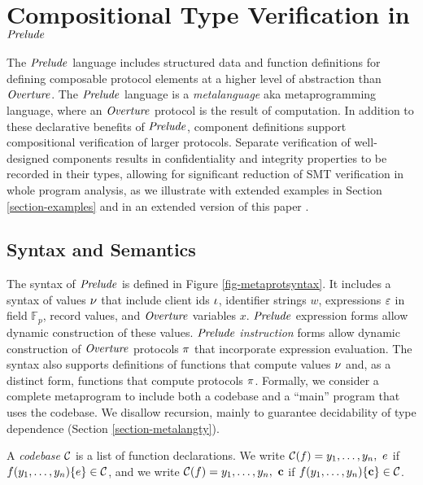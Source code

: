 \section{Compositional Type Verification in $\mathit{Prelude}$}
\label{section-metalang}

The $\mathit{Prelude}$ language \cite{skalka-near-ppdp24} includes structured
data and function definitions for defining composable protocol
elements at a higher level of abstraction than $\mathit{Overture}$.  The
$\mathit{Prelude}$ language is a \emph{metalanguage} aka metaprogramming
language, where an $\mathit{Overture}$ protocol is the result of
computation. In addition to these declarative benefits of $\mathit{Prelude}$,
component definitions support compositional verification of larger
protocols. Separate verification of well-designed components results
in confidentiality and integrity properties to be recorded in their
types, allowing for significant reduction of SMT verification in whole
program analysis, as we illustrate with extended examples in Section
\ref{section-examples} and in an extended version of this paper
\cite{skalka2025smtboostedsecuritytypeslowlevel}.

\metaprotsyntaxfig

\subsection{Syntax and Semantics}

The syntax of $\mathit{Prelude}$ is defined in Figure
\ref{fig-metaprotsyntax}.  It includes a syntax of values $\nu$ that
include client ids $\iota$, identifier strings $w$, expressions $\varepsilon$
in field $\mathbb{F}_p$, record values, and $\mathit{Overture}$ variables
$x$. $\mathit{Prelude}$ expression forms allow dynamic construction of these
values. $\mathit{Prelude}$ \emph{instruction} forms allow dynamic
construction of $\mathit{Overture}$ protocols $\pi$ that incorporate expression
evaluation. The syntax also supports definitions of functions that
compute values $\nu$ and, as a distinct form, functions that compute
protocols $\pi$.  Formally, we consider a complete metaprogram to include
both a codebase and a ``main'' program that uses the codebase.
We disallow recursion, mainly to guarantee decidability
of type dependence (Section \ref{section-metalangty}).
\begin{definition}
A \emph{codebase} $\mathcal{C}$ is a list of function 
declarations. We write $ \mathcal{C}(f) = y_1,\ldots,y_n,\ e$
if $f(y_1,\ldots,y_n) \{ e \} \in \mathcal{C}$, and we
write  $ \codebase(f) = y_1,\ldots,y_n,\ \instr$
if $f(y_1,\ldots,y_n) \{ \mathbf{c} \} \in \mathcal{C}$.
\end{definition}

